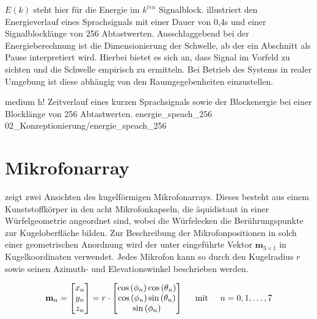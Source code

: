 $E(k)$ steht hier für die Energie im $k^{ten}$ Signalblock.  illustriert den Energieverlauf eines Sprachsignals mit einer Dauer von 0,4s und einer Signalblocklänge von 256 Abtastwerten. Ausschlaggebend bei der Energieberechnung ist die Dimensionierung der Schwelle, ab der ein Abschnitt als Pause interpretiert wird. Hierbei bietet es sich an, dass Signal im Vorfeld zu sichten und die Schwelle empirisch zu ermitteln. Bei Betrieb des Systems in realer Umgebung ist diese abhängig von den Raumgegebenheiten einzustellen.

         {medium}                 %
         {h!}             %
         {Zeitverlauf eines kurzen Sprachsignals sowie der Blockenergie bei einer Blocklänge von 256 Abtastwerten.}                %
         {energie_speach_256}                %
         {02_Konzeptionierung/energie_speach_256}     %




\section{Mikrofonarray}
\label{sec:Mikrofonarray}
 zeigt zwei Ansichten des kugelförmigen Mikrofonarrays. Dieses besteht aus einem Kunststoffkörper in den acht Mikrofonkapseln, die äquidistant in einer Würfelgeometrie angeordnet sind, wobei die Würfelecken die Berührungspunkte zur Kugeloberfläche bilden. Zur Beschreibung der Mikrofonpositionen in solch einer geometrischen Anordnung wird der unter  eingeführte Vektor $\mathbf{m}_{3 \times 1}$ in Kugelkoordinaten verwendet. Jedes Mikrofon kann so durch den Kugelradius $r$ sowie seinen Azimuth- und Elevationswinkel beschrieben werden.

\begin{equation}
\textbf{m}_n =
\begin{bmatrix}
        x_n \\
        y_n \\
        z_n\\
    \end{bmatrix}
    = r \cdot
    \begin{bmatrix}
        \cos{(\phi_n)} \cos{(\theta_n)} \\
        \cos{(\phi_n)} \sin{(\theta_n)} \\
        \sin{(\phi_n)} \\
    \end{bmatrix}
    \hspace{0.5cm} \text{mit} \hspace{0.5cm} n = 0,1,\dots, 7
\end{equation}


